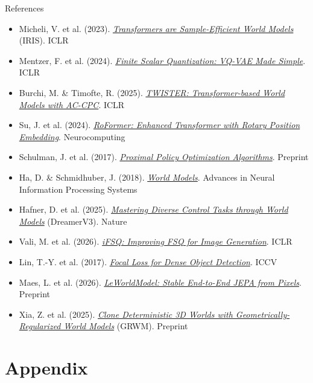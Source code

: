 \documentclass[aspectratio=169]{beamer}
\begin{document}
\begin{frame}[allowframebreaks]{References}
  \small
  \begin{itemize}
    \item Micheli, V. et al. (2023). \href{https://arxiv.org/abs/2209.00588}{\textit{Transformers are Sample-Efficient World Models}} (IRIS). ICLR
    \item Mentzer, F. et al. (2024). \href{https://arxiv.org/abs/2309.15505}{\textit{Finite Scalar Quantization: VQ-VAE Made Simple}}. ICLR
    \item Burchi, M. \& Timofte, R. (2025). \href{https://arxiv.org/abs/2503.04416}{\textit{TWISTER: Transformer-based World Models with AC-CPC}}. ICLR
    \item Su, J. et al. (2024). \href{https://arxiv.org/abs/2104.09864}{\textit{RoFormer: Enhanced Transformer with Rotary Position Embedding}}. Neurocomputing
    \item Schulman, J. et al. (2017). \href{https://arxiv.org/abs/1707.06347}{\textit{Proximal Policy Optimization Algorithms}}. Preprint
    \item Ha, D. \& Schmidhuber, J. (2018). \href{https://arxiv.org/abs/1803.10122}{\textit{World Models}}. Advances in Neural Information Processing Systems
    \item Hafner, D. et al. (2025). \href{https://arxiv.org/abs/2301.04104}{\textit{Mastering Diverse Control Tasks through World Models}} (DreamerV3). Nature
    \item Vali, M. et al. (2026). \href{https://arxiv.org/abs/2601.17124}{\textit{iFSQ: Improving FSQ for Image Generation}}. ICLR
    \item Lin, T.-Y. et al. (2017). \href{https://arxiv.org/abs/1708.02002}{\textit{Focal Loss for Dense Object Detection}}. ICCV
    \item Maes, L. et al. (2026). \href{https://arxiv.org/abs/2603.19312}{\textit{LeWorldModel: Stable End-to-End JEPA from Pixels}}. Preprint
    \item Xia, Z. et al. (2025). \href{https://arxiv.org/abs/2510.26782}{\textit{Clone Deterministic 3D Worlds with Geometrically-Regularized World Models}} (GRWM). Preprint
  \end{itemize}
\end{frame}

\appendix
\section{Appendix}
\end{document}
